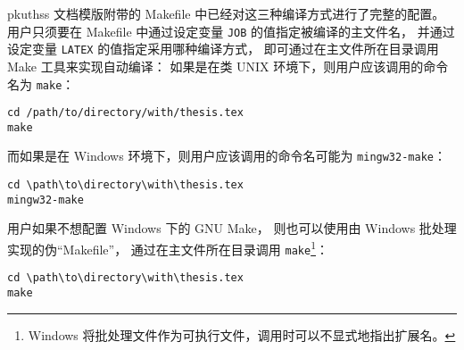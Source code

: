 pkuthss 文档模版附带的 Makefile 中已经对这三种编译方式进行了完整的配置。
用户只须要在 Makefile 中通过设定变量 \verb|JOB| 的值指定被编译的主文件名，
并通过设定变量 \verb|LATEX| 的值指定采用哪种编译方式，
即可通过在主文件所在目录调用 Make 工具来实现自动编译：
如果是在类 UNIX 环境下，则用户应该调用的命令名为 \verb|make|：
\begin{Verbatim}
cd /path/to/directory/with/thesis.tex
make
\end{Verbatim}
而如果是在 Windows 环境下，则用户应该调用的命令名可能为 \verb|mingw32-make|：
\begin{Verbatim}
cd \path\to\directory\with\thesis.tex
mingw32-make
\end{Verbatim}

用户如果不想配置 Windows 下的 GNU Make，
则也可以使用由 Windows 批处理实现的伪“Makefile”，
通过在主文件所在目录调用 \verb|make|\footnote{%
	Windows 将批处理文件作为可执行文件，调用时可以不显式地指出扩展名。%
}：
\begin{Verbatim}
cd \path\to\directory\with\thesis.tex
make
\end{Verbatim}

